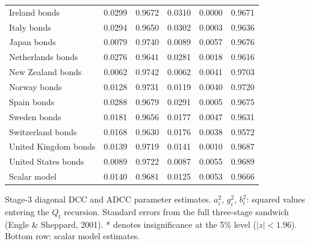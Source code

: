\begin{table}[H]
\begin{threeparttable}
\begin{tabular}{lSSSSS}
\hspace{1em}Ireland bonds & 0.0299 & 0.9672 & 0.0310 & 0.0000\text{*} & 0.9671 \\
\hspace{1em}Italy bonds & 0.0294 & 0.9650 & 0.0302 & 0.0003\text{*} & 0.9636 \\
\hspace{1em}Japan bonds & 0.0079\text{*} & 0.9740 & 0.0089 & 0.0057 & 0.9676 \\
\hspace{1em}Netherlands bonds & 0.0276 & 0.9641 & 0.0281 & 0.0018 & 0.9616 \\
\hspace{1em}New Zealand bonds & 0.0062\text{*} & 0.9742 & 0.0062 & 0.0041 & 0.9703 \\
\hspace{1em}Norway bonds & 0.0128 & 0.9731 & 0.0119 & 0.0040 & 0.9720 \\
\hspace{1em}Spain bonds & 0.0288 & 0.9679 & 0.0291 & 0.0005\text{*} & 0.9675 \\
\hspace{1em}Sweden bonds & 0.0181 & 0.9656 & 0.0177 & 0.0047 & 0.9631 \\
\hspace{1em}Switzerland bonds & 0.0168\text{*} & 0.9630 & 0.0176 & 0.0038 & 0.9572 \\
\hspace{1em}United Kingdom bonds & 0.0139 & 0.9719 & 0.0141 & 0.0010 & 0.9687 \\
\hspace{1em}United States bonds & 0.0089 & 0.9722 & 0.0087 & 0.0055 & 0.9689 \\
\midrule
Scalar model & 0.0140 & 0.9681 & 0.0125 & 0.0053 & 0.9666 \\
\bottomrule
\end{tabular}
\begin{tablenotes}[flushleft]
\small
\item Stage-3 diagonal DCC and ADCC parameter estimates. $a_i^2$, $g_i^2$, $b_i^2$: squared values entering the $Q_t$ recursion. Standard errors from the full three-stage sandwich (Engle \& Sheppard, 2001). * denotes insignificance at the 5\% level ($|z|<1.96$). Bottom row: scalar model estimates.
\end{tablenotes}
\end{threeparttable}
\end{table}
